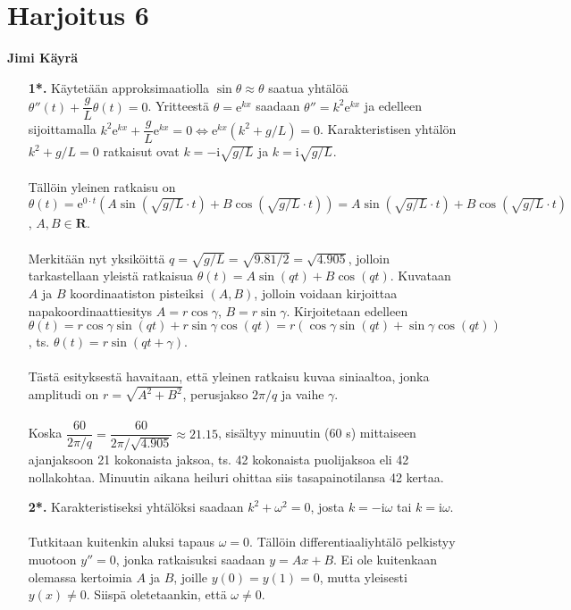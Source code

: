 \documentclass[12pt,fleqn]{article}
\begin{document}
\section*{Harjoitus 6}
\textbf{Jimi Käyrä}\\
\begin{enumerate}[label=\textbf{\arabic*.}]
\item [\textbf{1*.}] Käytetään approksimaatiolla \(\sin \theta \approx \theta\) saatua yhtälöä \(\theta ''(t)+\dfrac{g}{L}\theta (t)=0\). Yritteestä \(\theta =\text{e}^{kx}\) saadaan \(\theta ''=k^2\text{e}^{kx}\) ja edelleen sijoittamalla \(k^2\text{e}^{kx}+\dfrac{g}{L}\text{e}^{kx}=0\iff \text{e}^{kx} (k^2+g/L)=0\). Karakteristisen yhtälön \(k^2+g/L=0\) ratkaisut ovat \(k=-\text{i}\sqrt{g/L}\) ja \(k=\text{i} \sqrt{g/L}\).\\
 \\
Tällöin yleinen ratkaisu on \(\theta (t)=\text{e}^{0\cdot t} (A\sin (\sqrt{g/L}\cdot t)+B\cos (\sqrt{g/L}\cdot t))=A\sin ( \sqrt{g/L}\cdot t)+B\cos (\sqrt{g/L}\cdot t)\), \(A, B\in \mathbf{R}\).\\
 \\
Merkitään nyt yksiköittä \(q=\sqrt{g/L}=\sqrt{9.81/2}=\sqrt{4.905}\), jolloin tarkastellaan yleistä ratkaisua \(\theta (t)=A\sin (qt)+B\cos (qt)\). Kuvataan \(A\) ja \(B\) koordinaatiston pisteiksi \((A, B)\), jolloin voidaan kirjoittaa napakoordinaattiesitys \(A=r\cos \gamma\), \(B=r\sin \gamma\). Kirjoitetaan edelleen \(\theta (t)=r\cos \gamma \sin (qt)+r\sin \gamma \cos (qt)=r(\cos \gamma \sin (qt)+\sin \gamma \cos (qt))\), ts. \(\theta (t)=r\sin (qt+\gamma)\).\\
 \\
Tästä esityksestä havaitaan, että yleinen ratkaisu kuvaa siniaaltoa, jonka amplitudi on \(r=\sqrt{A^2+B^2}\), perusjakso \(2 \pi /q\) ja vaihe \(\gamma\).\\
 \\
Koska \(\dfrac{60}{2\pi /q}=\dfrac{60}{2\pi /\sqrt{4.905}}\approx 21.15\), sisältyy minuutin (60 s) mittaiseen ajanjaksoon 21 kokonaista jaksoa, ts. 42 kokonaista puolijaksoa eli 42 nollakohtaa. Minuutin aikana heiluri ohittaa siis tasapainotilansa 42 kertaa.\\
\item [\textbf{2*.}]
Karakteristiseksi yhtälöksi saadaan \(k^2+\omega ^2=0\), josta \(k=-\text{i}\omega\) tai \(k=\text{i}\omega\).\\
 \\
Tutkitaan kuitenkin aluksi tapaus \(\omega =0\). Tällöin differentiaaliyhtälö pelkistyy muotoon \(y''=0\), jonka ratkaisuksi saadaan \(y=Ax+B\). Ei ole kuitenkaan olemassa kertoimia \(A\) ja \(B\), joille \(y(0)=y(1)=0\), mutta yleisesti \(y(x)\neq 0\). Siispä oletetaankin, että \(\omega \neq 0\).\\

\end{enumerate}
\end{document}
